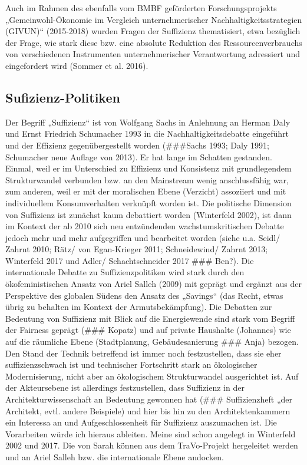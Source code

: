 \documentclass[a4paper,11pt,twoside]{scrartcl}
\begin{document}
Auch im Rahmen des ebenfalls vom BMBF geförderten Forschungsprojekts „Gemeinwohl-Ökonomie im Vergleich unternehmerischer Nachhaltigkeitsstrategien (GIVUN)“ (2015-2018) wurden Fragen der Suffizienz thematisiert, etwa bezüglich der Frage, wie stark diese bzw. eine absolute Reduktion des Ressourcenverbrauchs von verschiedenen Instrumenten unternehmerischer Verantwortung adressiert und eingefordert wird (Sommer et al. 2016).
    
\subsection*{Sufizienz-Politiken}
Der Begriff „Suffizienz“ ist von Wolfgang Sachs in Anlehnung an Herman Daly und Ernst Friedrich Schumacher 1993 in die Nachhaltigkeitsdebatte eingeführt und der Effizienz gegenübergestellt worden (###Sachs 1993; Daly 1991; Schumacher neue Auflage von 2013). Er hat lange im Schatten gestanden. Einmal, weil er im Unterschied zu Effizienz und Konsistenz mit grundlegendem Strukturwandel verbunden bzw. an den Mainstream wenig anschlussfähig war, zum anderen, weil er mit der moralischen Ebene (Verzicht) assoziiert und mit individuellem Konsumverhalten verknüpft worden ist. Die politische Dimension von Suffizienz ist zunächst kaum debattiert worden (Winterfeld 2002), ist dann im Kontext der ab 2010 sich neu entzündenden wachstumskritischen Debatte jedoch mehr und mehr aufgegriffen und bearbeitet worden (siehe u.a. Seidl/ Zahrnt 2010; Rätz/ von Egan-Krieger 2011; Schneidewind/ Zahrnt 2013; Winterfeld 2017 und Adler/ Schachtschneider 2017 ### Ben?). Die internationale Debatte zu Suffizienzpolitiken wird stark durch den ökofeministischen Ansatz von Ariel Salleh (2009) mit geprägt und ergänzt aus der Perspektive des globalen Südens den Ansatz des „Savings“ (das Recht, etwas übrig zu behalten im Kontext der Armutsbekämpfung).
Die Debatten zur Bedeutung von Suffizienz mit Blick auf die Energiewende sind stark vom Begriff der Fairness geprägt (### Kopatz) und auf private Haushalte (Johannes) wie auf die räumliche Ebene (Stadtplanung, Gebäudesanierung ### Anja) bezogen. 
Den Stand der Technik betreffend ist immer noch festzustellen, dass sie eher suffizienzschwach ist und technischer Fortschritt stark an ökologischer Modernisierung, nicht aber an ökologischem Strukturwandel ausgerichtet ist. Auf der Akteursebene ist allerdings festzustellen, dass Suffizienz in der Architekturwissenschaft an Bedeutung gewonnen hat (### Suffizienzheft „der Architekt, evtl. andere Beispiele) und hier bis hin zu den Architektenkammern ein Interessa an und Aufgeschlossenheit für Suffizienz auszumachen ist.
Die Vorarbeiten würde ich hieraus ableiten. Meine sind schon angelegt in Winterfeld 2002 und 2017. Die von Sarah können aus dem TraVo-Projekt hergeleitet werden und an Ariel Salleh bzw. die internationale Ebene andocken.
\end{document}
